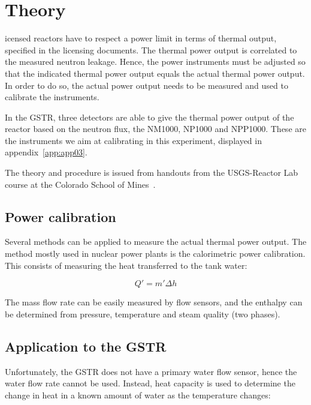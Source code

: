 %
%
\let\textcircled=\pgftextcircled
\chapter{Theory}
\label{chap:intro}

icensed reactors have to respect a power limit in terms of thermal output, specified in the licensing documents. The thermal power output is correlated to the measured neutron leakage. Hence, the power instruments must be adjusted so that the indicated thermal power output equals the actual thermal power output. In order to do so, the actual power output needs to be measured and used to calibrate the instruments.

In the GSTR, three detectors are able to give the thermal power output of the reactor based on the neutron flux, the NM1000, NP1000 and NPP1000. These are the instruments we aim at calibrating in this experiment, displayed in appendix~\ref{app:app03}.

The theory and procedure is issued from handouts from the USGS-Reactor Lab course at the Colorado School of Mines~\cite{reactor01}.

\section{Power calibration}
\label{sec:powercalib}

Several methods can be applied to measure the actual thermal power output. The method mostly used in nuclear power plants is the calorimetric power calibration. This consists of measuring the heat transferred to the tank water:

\begin{equation}\label{eq1}
Q' = m'\Delta h
\end{equation}

The mass flow rate can be easily measured by flow sensors, and the enthalpy can be determined from pressure, temperature and steam quality (two phases).

\section{Application to the GSTR}

Unfortunately, the GSTR does not have a primary water flow sensor, hence the water flow rate cannot be used. Instead, heat capacity is used to determine the change in heat in a known amount of water as the temperature changes:


